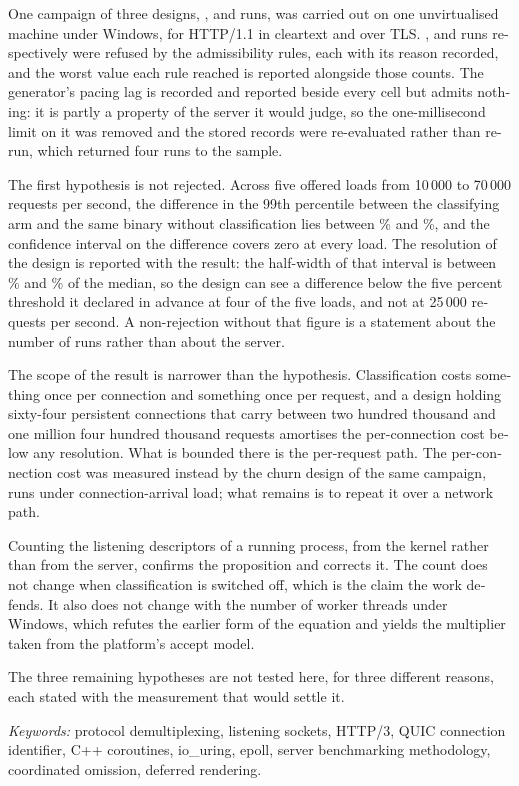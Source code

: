 \begin{otherlanguage}{english}
One campaign of three designs, ,  and
 runs, was carried out on one unvirtualised machine under Windows, for
HTTP/1.1 in cleartext and over TLS. , 
and  runs respectively were refused by the admissibility rules, each
with its reason recorded, and the worst value each rule reached is reported alongside those
counts. The generator's pacing lag is recorded and reported beside every cell but admits nothing:
it is partly a property of the server it would judge, so the one-millisecond limit on it was
removed and the stored records were re-evaluated rather than re-run, which returned
four runs to the sample.

The first hypothesis is not rejected. Across five offered loads from 10\,000 to
70\,000 requests per second, the difference in the 99th percentile between the
classifying arm and the same binary without classification lies between
\% and \%, and the confidence interval on
the difference covers zero at every load. The resolution of the design is reported with
the result: the half-width of that interval is between
\% and \% of the median, so
the design can see a difference below the five percent threshold it declared in advance
at four of the five loads, and not at 25\,000 requests per second. A non-rejection without that figure is a statement about the
number of runs rather than about the server.

The scope of the result is narrower than the hypothesis. Classification costs something
once per connection and something once per request, and a design holding sixty-four
persistent connections that carry between two hundred thousand and one million four
hundred thousand requests amortises the per-connection cost below any resolution. What is
bounded there is the per-request path. The per-connection cost was measured instead by the
churn design of the same campaign,  runs under connection-arrival
load; what remains is to repeat it over a network path.

Counting the listening descriptors of a running process, from the kernel rather than
from the server, confirms the proposition and corrects it. The count does not change
when classification is switched off, which is the claim the work defends. It also does
not change with the number of worker threads under Windows, which refutes the earlier
form of the equation and yields the multiplier taken from the platform's accept model.

The three remaining hypotheses are not tested here, for three different reasons, each
stated with the measurement that would settle it.

\vspace{0.5em}
\noindent
\emph{Keywords:} protocol demultiplexing, listening sockets, HTTP/3, QUIC connection
identifier, C++ coroutines, io\_uring, epoll, server benchmarking methodology,
coordinated omission, deferred rendering.

\endgroup
\end{otherlanguage}

